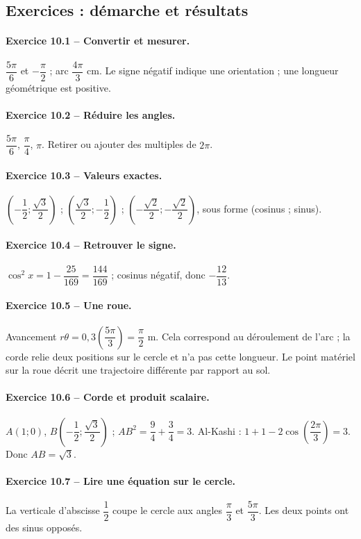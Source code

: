 \subsection*{Exercices : démarche et résultats}
\paragraph{Exercice 10.1 -- Convertir et mesurer.} $\dfrac{5\pi}{6}$ et $-\dfrac{\pi}{2}$ ; arc $\dfrac{4\pi}{3}$ cm. Le signe négatif indique une orientation ; une longueur géométrique est positive.
\paragraph{Exercice 10.2 -- Réduire les angles.} $\dfrac{5\pi}{6}$, $\dfrac{\pi}{4}$, $\pi$. Retirer ou ajouter des multiples de $2\pi$.
\paragraph{Exercice 10.3 -- Valeurs exactes.} $(-\dfrac{1}{2};\dfrac{\sqrt 3}{2})$ ; $(\dfrac{\sqrt 3}{2};-\dfrac{1}{2})$ ; $(-\dfrac{\sqrt 2}{2};-\dfrac{\sqrt 2}{2})$, sous forme (cosinus ; sinus).
\paragraph{Exercice 10.4 -- Retrouver le signe.} $\cos ^2x=1-\dfrac{25}{169}=\dfrac{144}{169}$ ; cosinus négatif, donc $-\dfrac{12}{13}$.
\paragraph{Exercice 10.5 -- Une roue.} Avancement $r\theta =0{,}3(\dfrac{5\pi}{3})=\dfrac{\pi}{2}$ m. Cela correspond au déroulement de l’arc ; la corde relie deux positions sur le cercle et n’a pas cette longueur. Le point matériel sur la roue décrit une trajectoire différente par rapport au sol.
\paragraph{Exercice 10.6 -- Corde et produit scalaire.} $A(1;0)$, $B(-\dfrac{1}{2};\dfrac{\sqrt 3}{2})$ ; $AB^2=\dfrac{9}{4}+\dfrac{3}{4}=3$. Al-Kashi : $1+1-2\cos (\dfrac{2\pi}{3})=3$. Donc $AB=\sqrt3$.
\paragraph{Exercice 10.7 -- Lire une équation sur le cercle.} La verticale d’abscisse $\dfrac{1}{2}$ coupe le cercle aux angles $\dfrac{\pi}{3}$ et $\dfrac{5\pi}{3}$. Les deux points ont des sinus opposés.
